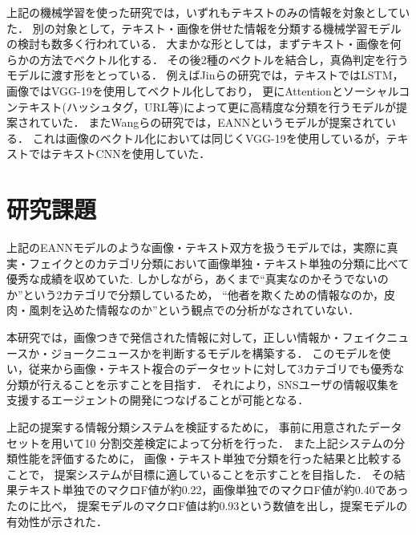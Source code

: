 上記の機械学習を使った研究では，いずれもテキストのみの情報を対象としていた．
別の対象として，テキスト・画像を併せた情報を分類する機械学習モデルの検討も数多く行われている．
大まかな形としては，まずテキスト・画像を何らかの方法でベクトル化する．
その後2種のベクトルを結合し，真偽判定を行うモデルに渡す形をとっている．
例えばJinらの研究\cite{jin2017multimodal}では，テキストではLSTM，画像ではVGG-19を使用してベクトル化しており，
更にAttentionとソーシャルコンテキスト(ハッシュタグ，URL等)によって更に高精度な分類を行うモデルが提案されていた．
またWangらの研究\cite{wang2018eann}では，EANNというモデルが提案されている．
これは画像のベクトル化においては同じくVGG-19を使用しているが，テキストではテキストCNNを使用していた．

\section{研究課題}
上記のEANNモデルのような画像・テキスト双方を扱うモデルでは，実際に真実・フェイクとのカテゴリ分類において画像単独・テキスト単独の分類に比べて優秀な成績を収めていた\cite{wang2018eann}.\@
しかしながら，あくまで``真実なのかそうでないのか''という2カテゴリで分類しているため，
``他者を欺くための情報なのか，皮肉・風刺を込めた情報なのか''という観点での分析がなされていない．

本研究では，画像つきで発信された情報に対して，正しい情報か・フェイクニュースか・ジョークニュースかを判断するモデルを構築する．
このモデルを使い，従来から画像・テキスト複合のデータセットに対して3カテゴリでも優秀な分類が行えることを示すことを目指す．
それにより，SNSユーザの情報収集を支援するエージェントの開発につなげることが可能となる．

上記の提案する情報分類システムを検証するために，
事前に用意されたデータセットを用いて10 分割交差検定によって分析を行った．
また上記システムの分類性能を評価するために，
画像・テキスト単独で分類を行った結果と比較することで，
提案システムが目標に適していることを示すことを目指した．
その結果テキスト単独でのマクロF値が約0.22，画像単独でのマクロF値が約0.40であったのに比べ，
提案モデルのマクロF値は約0.93という数値を出し，提案モデルの有効性が示された．

% 
